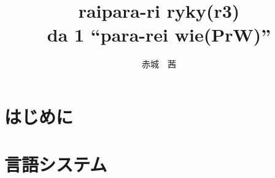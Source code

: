 \documentclass[a4paper, 12pt, titlepage]{ltjsarticle}
\title{raipara-ri ryky(r3) \\ \small da 1 ``para-rei wie(PrW)''}
\author{赤城　茜}
\begin{document}
\maketitle

\tableofcontents \clearpage

\part{はじめに}

 \clearpage

\part{言語システム}

 \clearpage
 \clearpage
 \clearpage
\end{document}
